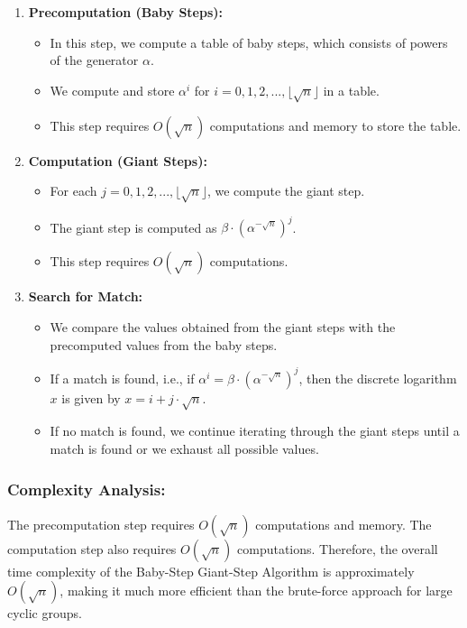 \documentclass[11pt]{article}
\begin{document}
\begin{enumerate}
    \item \textbf{Precomputation (Baby Steps):}
    \begin{itemize}
        \item In this step, we compute a table of baby steps, which consists of powers of the generator $\alpha$.
        \item We compute and store $\alpha^i$ for $i = 0, 1, 2, ..., \lfloor \sqrt{n} \rfloor$ in a table.
        \item This step requires $O(\sqrt{n})$ computations and memory to store the table.
    \end{itemize}
    
    \item \textbf{Computation (Giant Steps):}
    \begin{itemize}
        \item For each $j = 0, 1, 2, ..., \lfloor \sqrt{n} \rfloor$, we compute the giant step.
        \item The giant step is computed as $\beta \cdot (\alpha^{-\sqrt{n}})^j$.
        \item This step requires $O(\sqrt{n})$ computations.
    \end{itemize}
    
    \item \textbf{Search for Match:}
    \begin{itemize}
        \item We compare the values obtained from the giant steps with the precomputed values from the baby steps.
        \item If a match is found, i.e., if $\alpha^i = \beta \cdot (\alpha^{-\sqrt{n}})^j$, then the discrete logarithm $x$ is given by $x = i + j \cdot \sqrt{n}$.
        \item If no match is found, we continue iterating through the giant steps until a match is found or we exhaust all possible values.
    \end{itemize}
\end{enumerate}

\subsubsection{Complexity Analysis:}

The precomputation step requires $O(\sqrt{n})$ computations and memory. The computation step also requires $O(\sqrt{n})$ computations. Therefore, the overall time complexity of the Baby-Step Giant-Step Algorithm is approximately $O(\sqrt{n})$, making it much more efficient than the brute-force approach for large cyclic groups.
\end{document}
